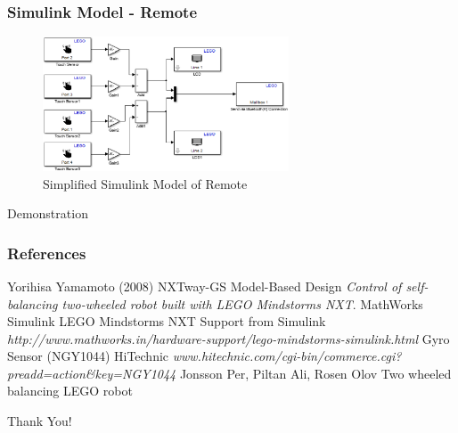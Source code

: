 \documentclass[aspectratio=169]{beamer}
\begin{document}

\begin{frame}
\frametitle{Simulink Model - Remote}
\begin{figure}
	\includegraphics[width=0.65\textwidth]{smdlRemote.eps}
	\caption{Simplified Simulink Model of Remote}
\end{figure}
\end{frame}


\begin{frame}
\Huge{\centerline{Demonstration}}
\end{frame}


\begin{frame}
\frametitle{References}
\footnotesize{
\begin{thebibliography}{99} %
 Yorihisa Yamamoto (2008)
\newblock NXTway-GS Model-Based Design
\newblock \emph{Control of self-balancing two-wheeled robot built with LEGO Mindstorms NXT}.
 MathWorks Simulink
\newblock LEGO Mindstorms NXT Support from Simulink
\newblock \emph{http://www.mathworks.in/hardware-support/lego-mindstorms-simulink.html}
 Gyro Sensor (NGY1044)
\newblock HiTechnic
\newblock \emph{www.hitechnic.com/cgi-bin/commerce.cgi?preadd=action\&key=NGY1044}
 Jonsson Per, Piltan Ali, Rosen Olov
\newblock Two wheeled balancing LEGO robot

\end{thebibliography}
}
\end{frame}


\begin{frame}
\Huge{\centerline{Thank You!}}
\end{frame}

\end{document}
